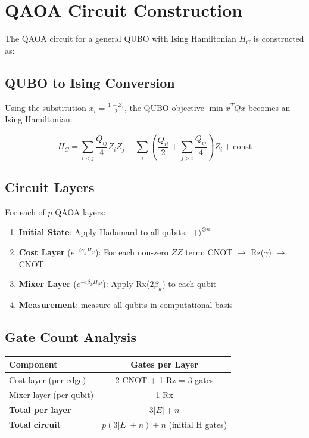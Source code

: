 \documentclass[11pt,a4paper]{article}
\begin{document}
\section{QAOA Circuit Construction}

The QAOA circuit for a general QUBO with Ising Hamiltonian $H_C$ is constructed as:

\subsection{QUBO to Ising Conversion}

Using the substitution $x_i = \frac{1 - Z_i}{2}$, the QUBO objective $\min x^T Q x$ becomes an Ising Hamiltonian:

$$H_C = \sum_{i<j} \frac{Q_{ij}}{4} Z_i Z_j - \sum_i \left(\frac{Q_{ii}}{2} + \sum_{j>i} \frac{Q_{ij}}{4}\right) Z_i + \text{const}$$

\subsection{Circuit Layers}

For each of $p$ QAOA layers:

\begin{enumerate}
  \item \textbf{Initial State}: Apply Hadamard to all qubits: $|+\rangle^{\otimes n}$
  \item \textbf{Cost Layer} ($e^{-i\gamma_k H_C}$): For each non-zero $ZZ$ term: CNOT $\to$ Rz($\gamma$) $\to$ CNOT
  \item \textbf{Mixer Layer} ($e^{-i\beta_k H_M}$): Apply Rx($2\beta_k$) to each qubit
  \item \textbf{Measurement}: measure all qubits in computational basis
\end{enumerate}

\subsection{Gate Count Analysis}

\begin{center}
\begin{tabular}{lc}
  \toprule
  \textbf{Component} & \textbf{Gates per Layer} \\
  \midrule
  Cost layer (per edge) & 2 CNOT + 1 Rz = 3 gates \\
  Mixer layer (per qubit) & 1 Rx \\
  \midrule
  \textbf{Total per layer} & $3|E| + n$ \\
  \textbf{Total circuit} & $p(3|E| + n) + n$ (initial H gates) \\
  \bottomrule
\end{tabular}
\end{center}
\end{document}
